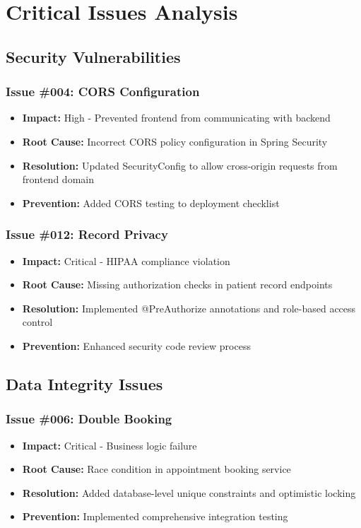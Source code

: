 \documentclass[12pt,a4paper]{article}
\begin{document}
\section{Critical Issues Analysis}

\subsection{Security Vulnerabilities}

\subsubsection{Issue \#004: CORS Configuration}
\begin{itemize}
    \item \textbf{Impact:} High - Prevented frontend from communicating with backend
    \item \textbf{Root Cause:} Incorrect CORS policy configuration in Spring Security
    \item \textbf{Resolution:} Updated SecurityConfig to allow cross-origin requests from frontend domain
    \item \textbf{Prevention:} Added CORS testing to deployment checklist
\end{itemize}

\subsubsection{Issue \#012: Record Privacy}
\begin{itemize}
    \item \textbf{Impact:} Critical - HIPAA compliance violation
    \item \textbf{Root Cause:} Missing authorization checks in patient record endpoints
    \item \textbf{Resolution:} Implemented @PreAuthorize annotations and role-based access control
    \item \textbf{Prevention:} Enhanced security code review process
\end{itemize}

\subsection{Data Integrity Issues}

\subsubsection{Issue \#006: Double Booking}
\begin{itemize}
    \item \textbf{Impact:} Critical - Business logic failure
    \item \textbf{Root Cause:} Race condition in appointment booking service
    \item \textbf{Resolution:} Added database-level unique constraints and optimistic locking
    \item \textbf{Prevention:} Implemented comprehensive integration testing
\end{itemize}
\end{document}
